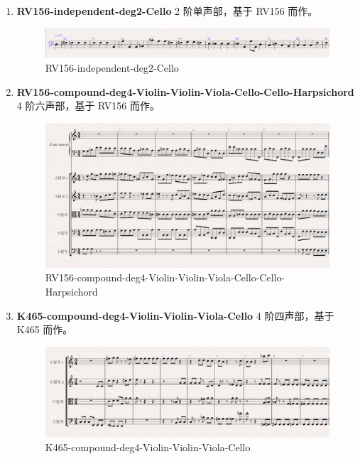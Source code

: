 \documentclass[11pt]{article}
\begin{document}
\begin{enumerate}
\item \textbf{RV156-independent-deg2-Cello} 2 阶单声部，基于 RV156 而作。
\begin{figure}[hptb]
	\centering
	\label{fig:RV156-independent-deg2-Cello}
	\includegraphics[width=\textwidth]{pic/RV156-independent-deg2-Cello.eps}
	\caption{RV156-independent-deg2-Cello}
\end{figure}

\item \textbf{RV156-compound-deg4-Violin-Violin-Viola-Cello-Cello-Harpsichord} 4 阶六声部，基于 RV156 而作。
\begin{figure}[hptb]
	\centering
	\label{fig:RV156-compound-deg4-Violin-Violin-Viola-Cello-Cello-Harpsichord}
	\includegraphics[width=\textwidth]{pic/RV156-compound-deg4-Violin-Violin-Viola-Cello-Cello-Harpsichord.eps}
	\caption{RV156-compound-deg4-Violin-Violin-Viola-Cello-Cello-Harpsichord}
\end{figure}

\item \textbf{K465-compound-deg4-Violin-Violin-Viola-Cello} 4 阶四声部，基于 K465 而作。
\begin{figure}[hptb]
	\centering
	\label{fig:K465-compound-deg4-Violin-Violin-Viola-Cello}
	\includegraphics[width=\textwidth]{pic/K465-compound-deg4-Violin-Violin-Viola-Cello.eps}
	\caption{K465-compound-deg4-Violin-Violin-Viola-Cello}
\end{figure}
\end{enumerate}
\end{document}
